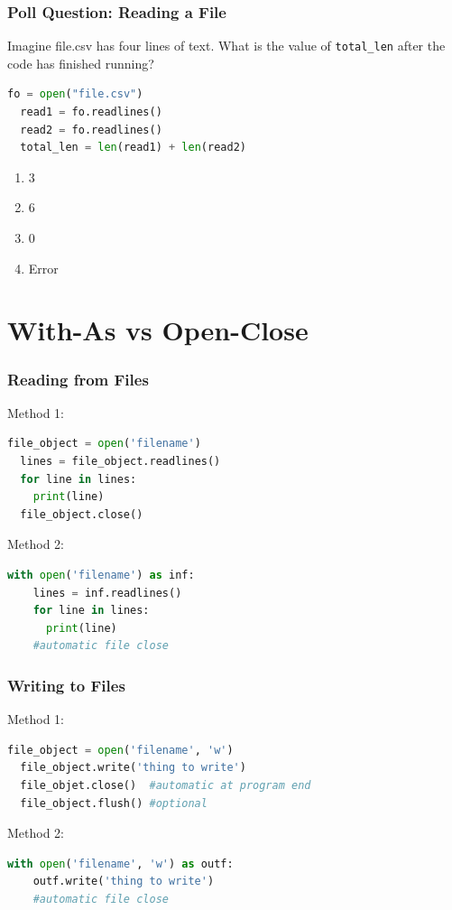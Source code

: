 \documentclass{beamer}
\begin{document}
%
%
\begin{frame}[fragile]
  \frametitle{Poll Question: Reading a File}
  Imagine file.csv has four lines of text. What is the value of \lstinline|total_len| after the code has finished running?
  \begin{lstlisting}[language=Python, autogobble]
  fo = open("file.csv")
  read1 = fo.readlines()
  read2 = fo.readlines()
  total_len = len(read1) + len(read2)
  \end{lstlisting} 
  \vfill
  \begin{enumerate}[A]
    \item 3
    \item 6
    \item 0
    \item Error
  \end{enumerate}
\end{frame}


\section{With-As vs Open-Close}
%
%
\begin{frame}[fragile]
  \frametitle{Reading from Files}
  Method 1:
  \begin{lstlisting}[language=Python, autogobble]
  file_object = open('filename')
  lines = file_object.readlines()
  for line in lines:
    print(line)
  file_object.close()
  \end{lstlisting}
  \vfill
  Method 2:
  \begin{lstlisting}[language=Python, autogobble]
  with open('filename') as inf:
    lines = inf.readlines()
    for line in lines:
      print(line)
    #automatic file close
  \end{lstlisting}
\end{frame}

%
%
\begin{frame}[fragile]
  \frametitle{Writing to Files}
  Method 1:
  \begin{lstlisting}[language=Python, autogobble]
  file_object = open('filename', 'w')
  file_object.write('thing to write')
  file_objet.close()  #automatic at program end
  file_object.flush() #optional
  \end{lstlisting}
  \vfill
  Method 2:
  \begin{lstlisting}[language=Python, autogobble]
  with open('filename', 'w') as outf:
    outf.write('thing to write')
    #automatic file close
  \end{lstlisting}
\end{frame}
\end{document}
